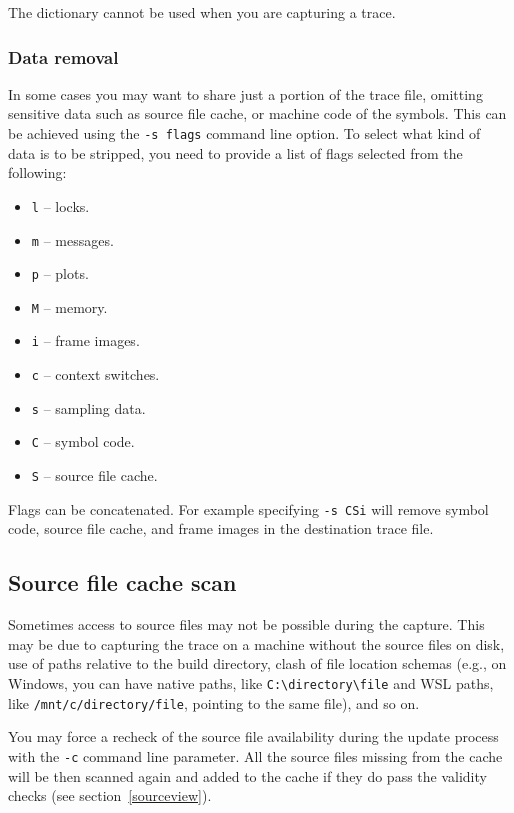\documentclass[hidelinks,titlepage,a4paper]{article}
\begin{document}
The dictionary cannot be used when you are capturing a trace.

\subsubsection{Data removal}
\label{dataremoval}

In some cases you may want to share just a portion of the trace file, omitting sensitive data such as source file cache, or machine code of the symbols. This can be achieved using the \texttt{-s flags} command line option. To select what kind of data is to be stripped, you need to provide a list of flags selected from the following:

\begin{itemize}
\item \texttt{l} -- locks.
\item \texttt{m} -- messages.
\item \texttt{p} -- plots.
\item \texttt{M} -- memory.
\item \texttt{i} -- frame images.
\item \texttt{c} -- context switches.
\item \texttt{s} -- sampling data.
\item \texttt{C} -- symbol code.
\item \texttt{S} -- source file cache.
\end{itemize}

Flags can be concatenated. For example specifying \texttt{-s CSi} will remove symbol code, source file cache, and frame images in the destination trace file.

\subsection{Source file cache scan}

Sometimes access to source files may not be possible during the capture. This may be due to capturing the trace on a machine without the source files on disk, use of paths relative to the build directory, clash of file location schemas (e.g., on Windows, you can have native paths, like \texttt{C:\textbackslash{}directory\textbackslash{}file} and WSL paths, like \texttt{/mnt/c/directory/file}, pointing to the same file), and so on.

You may force a recheck of the source file availability during the update process with the \texttt{-c} command line parameter. All the source files missing from the cache will be then scanned again and added to the cache if they do pass the validity checks (see section~\ref{sourceview}).
\end{document}
